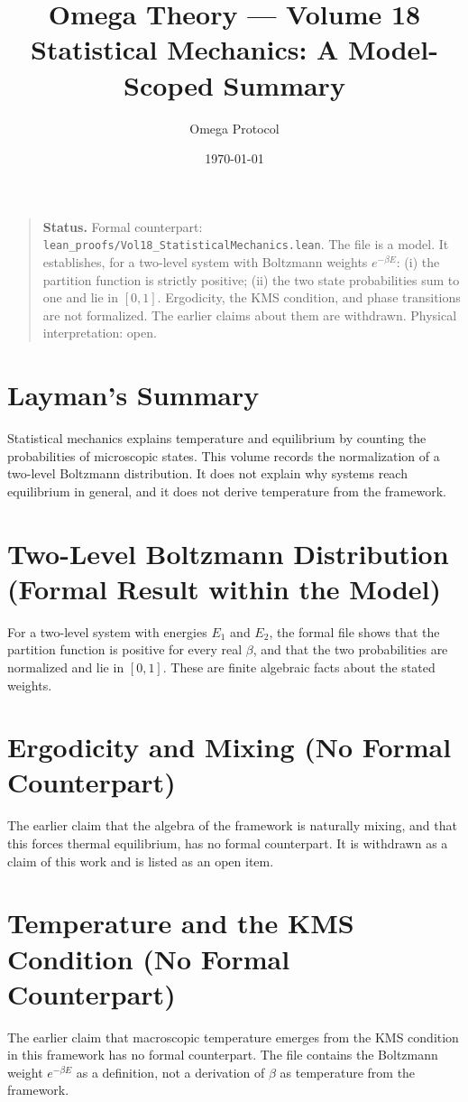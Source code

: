 \documentclass[11pt, a4paper]{article}
\title{Omega Theory --- Volume 18\\\Large Statistical Mechanics: A Model-Scoped Summary}
\author{Omega Protocol}
\date{\today}
\begin{document}
\maketitle

\begin{quote}
\textbf{Status.} Formal counterpart: \texttt{lean\_proofs/Vol18\_StatisticalMechanics.lean}. The file is a model. It establishes, for a two-level system with Boltzmann weights $e^{-\beta E}$: (i) the partition function is strictly positive; (ii) the two state probabilities sum to one and lie in $[0,1]$. Ergodicity, the KMS condition, and phase transitions are not formalized. The earlier claims about them are withdrawn. Physical interpretation: open.
\end{quote}

\section*{Layman's Summary}
Statistical mechanics explains temperature and equilibrium by counting the probabilities of microscopic states. This volume records the normalization of a two-level Boltzmann distribution. It does not explain why systems reach equilibrium in general, and it does not derive temperature from the framework.

\section{Two-Level Boltzmann Distribution (Formal Result within the Model)}
For a two-level system with energies $E_1$ and $E_2$, the formal file shows that the partition function is positive for every real $\beta$, and that the two probabilities are normalized and lie in $[0,1]$. These are finite algebraic facts about the stated weights.

\section{Ergodicity and Mixing (No Formal Counterpart)}
The earlier claim that the algebra of the framework is naturally mixing, and that this forces thermal equilibrium, has no formal counterpart. It is withdrawn as a claim of this work and is listed as an open item.

\section{Temperature and the KMS Condition (No Formal Counterpart)}
The earlier claim that macroscopic temperature emerges from the KMS condition in this framework has no formal counterpart. The file contains the Boltzmann weight $e^{-\beta E}$ as a definition, not a derivation of $\beta$ as temperature from the framework.
\end{document}
